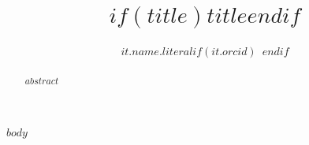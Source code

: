 \documentclass[biblatex,$nonblind$]{C:/Users/damon/Dropbox/templates/manuscripts/apsr_submission}
\title{$if(title)$$title$$endif$}
\author{$it.name.literal$$if(it.orcid)$~\orcidlink{$it.orcid$}$endif$}
        {$for(it.affiliations)$$it.name$$endfor$}
        {$if(it.attributes.corresponding)${Corresponding author. Email: \url{$it.email$} \\}$endif$$if(repo)${Replication materials: \url{$repo$}}$endif$}
\begin{document}
\begin{frontmatter}
\begin{abstract}
    $abstract$
\end{abstract}
\end{frontmatter}
\newpage

$body$

%

\newpage
\printbibliography
\end{document}
